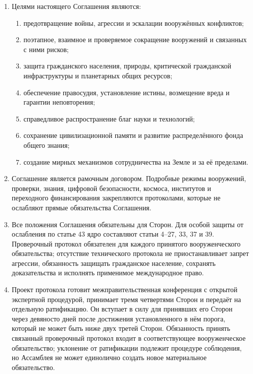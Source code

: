\documentclass[
  russian,
  11pt,
  a4paper,
]{article}
\providecommand{\tightlist}{%
  \setlength{\itemsep}{0pt}\setlength{\parskip}{0pt}}
\begin{document}
\begin{enumerate}
\def\labelenumi{\arabic{enumi}.}
\tightlist
\item
  Целями настоящего Соглашения являются:

  \begin{enumerate}
  \def\labelenumii{\arabic{enumii}.}
  \tightlist
  \item
    предотвращение войны, агрессии и эскалации вооружённых конфликтов;
  \item
    поэтапное, взаимное и проверяемое сокращение вооружений и связанных
    с ними рисков;
  \item
    защита гражданского населения, природы, критической гражданской
    инфраструктуры и планетарных общих ресурсов;
  \item
    обеспечение правосудия, установление истины, возмещение вреда и
    гарантии неповторения;
  \item
    справедливое распространение благ науки и технологий;
  \item
    сохранение цивилизационной памяти и развитие распределённого фонда
    общего знания;
  \item
    создание мирных механизмов сотрудничества на Земле и за её
    пределами.
  \end{enumerate}
\item
  Соглашение является рамочным договором. Подробные режимы вооружений,
  проверки, знания, цифровой безопасности, космоса, институтов и
  переходного финансирования закрепляются протоколами, которые не
  ослабляют прямые обязательства Соглашения.
\item
  Все положения Соглашения обязательны для Сторон. Для особой защиты от
  ослабления по статье 43 ядро составляют статьи 4--27, 33, 37 и 39.
  Проверочный протокол обязателен для каждого принятого вооруженческого
  обязательства; отсутствие технического протокола не приостанавливает
  запрет агрессии, обязанность защищать гражданское население, сохранять
  доказательства и исполнять применимое международное право.
\item
  Проект протокола готовит межправительственная конференция с открытой
  экспертной процедурой, принимает тремя четвертями Сторон и передаёт на
  отдельную ратификацию. Он вступает в силу для принявших его Сторон
  через девяносто дней после достижения установленного в нём порога,
  который не может быть ниже двух третей Сторон. Обязанность принять
  связанный проверочный протокол входит в соответствующее вооруженческое
  обязательство; уклонение от ратификации подлежит процедуре соблюдения,
  но Ассамблея не может единолично создать новое материальное
  обязательство.
\end{enumerate}
\end{document}

